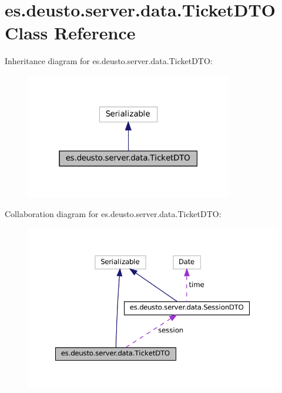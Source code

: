 \hypertarget{classes_1_1deusto_1_1server_1_1data_1_1_ticket_d_t_o}{}\section{es.\+deusto.\+server.\+data.\+Ticket\+D\+TO Class Reference}
\label{classes_1_1deusto_1_1server_1_1data_1_1_ticket_d_t_o}


Inheritance diagram for es.\+deusto.\+server.\+data.\+Ticket\+D\+TO\+:
\nopagebreak
\begin{figure}[H]
\begin{center}
\leavevmode
\includegraphics[width=256pt]{classes_1_1deusto_1_1server_1_1data_1_1_ticket_d_t_o__inherit__graph}
\end{center}
\end{figure}


Collaboration diagram for es.\+deusto.\+server.\+data.\+Ticket\+D\+TO\+:
\nopagebreak
\begin{figure}[H]
\begin{center}
\leavevmode
\includegraphics[width=350pt]{classes_1_1deusto_1_1server_1_1data_1_1_ticket_d_t_o__coll__graph}
\end{center}
\end{figure}
